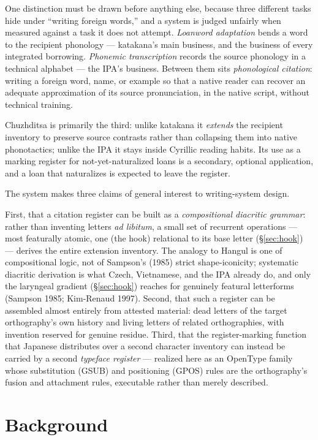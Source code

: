 \documentclass[11pt]{article}
\begin{document}
One distinction must be drawn before anything else, because three different tasks hide under ``writing foreign words,'' and a system is judged unfairly when measured against a task it does not attempt. \emph{Loanword adaptation} bends a word to the recipient phonology — katakana's main business, and the business of every integrated borrowing. \emph{Phonemic transcription} records the source phonology in a technical alphabet — the IPA's business. Between them sits \emph{phonological citation}: writing a foreign word, name, or example so that a native reader can recover an adequate approximation of its source pronunciation, in the native script, without technical training.

Chuzhditsa is primarily the third: unlike katakana it \emph{extends} the recipient inventory to preserve source contrasts rather than collapsing them into native phonotactics; unlike the IPA it stays inside Cyrillic reading habits. Its use as a marking register for not-yet-naturalized loans is a secondary, optional application, and a loan that naturalizes is expected to leave the register.

The system makes three claims of general interest to writing-system design.

First, that a citation register can be built as a \emph{compositional diacritic grammar}: rather than inventing letters \emph{ad libitum}, a small set of recurrent operations — most featurally atomic, one (the hook) relational to its base letter (\S\ref{sec:hook}) — derives the entire extension inventory. The analogy to Hangul is one of compositional logic, not of Sampson's (1985) strict shape-iconicity; systematic diacritic derivation is what Czech, Vietnamese, and the IPA already do, and only the laryngeal gradient (\S\ref{sec:hook}) reaches for genuinely featural letterforms (Sampson 1985; Kim-Renaud 1997). Second, that such a register can be assembled almost entirely from attested material: dead letters of the target orthography's own history and living letters of related orthographies, with invention reserved for genuine residue. Third, that the register-marking function that Japanese distributes over a second character inventory can instead be carried by a second \emph{typeface register} — realized here as an OpenType family whose substitution (GSUB) and positioning (GPOS) rules are the orthography's fusion and attachment rules, executable rather than merely described.

\section{Background}
\end{document}
